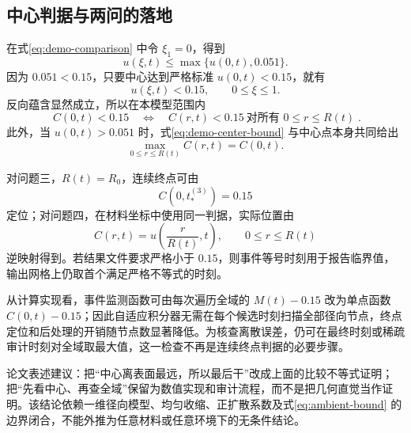 \documentclass[UTF8,a4paper,fontset=fandol]{ctexart}
\numberwithin{equation}{section}
\newcommand{\crit}{0.15}
\newcommand{\ambmax}{0.051}
\newcommand{\insertnote}[1]{\par\smallskip\noindent\colorbox{light}{\parbox{\dimexpr\linewidth-2\fboxsep\relax}{\small #1}}\par\smallskip}
\begin{document}
\subsection{中心判据与两问的落地}

在式\eqref{eq:demo-comparison} 中令 $\xi_1=0$，得到
\begin{equation}
  u(\xi,t)\le\max\{u(0,t),\ambmax\}.
  \label{eq:demo-center-bound}
\end{equation}
因为 $\ambmax<\crit$，只要中心达到严格标准 $u(0,t)<\crit$，就有
\begin{equation}
  u(\xi,t)<\crit,\qquad 0\le\xi\le1.
  \label{eq:demo-global-dry}
\end{equation}
反向蕴含显然成立，所以在本模型范围内
\begin{equation}
  \boxed{\;C(0,t)<\crit\quad\Longleftrightarrow\quad
  C(r,t)<\crit\ \text{对所有 }0\le r\le R(t)\;}.
  \label{eq:demo-equivalence}
\end{equation}
此外，当 $u(0,t)>\ambmax$ 时，式\eqref{eq:demo-center-bound} 与中心点本身共同给出
\begin{equation}
  \max_{0\le r\le R(t)}C(r,t)=C(0,t).
  \label{eq:demo-max-center}
\end{equation}

对问题三，$R(t)=R_0$，连续终点可由
\begin{equation}
  C(0,t_*^{(3)})=\crit
\end{equation}
定位；对问题四，在材料坐标中使用同一判据，实际位置由
\begin{equation}
  C(r,t)=u\!\left(\frac{r}{R(t)},t\right),\qquad 0\le r\le R(t)
\end{equation}
逆映射得到。若结果文件要求严格小于 $\crit$，则事件等号时刻用于报告临界值，输出网格上仍取首个满足严格不等式的时刻。

从计算实现看，事件监测函数可由每次遍历全域的 $M(t)-\crit$ 改为单点函数 $C(0,t)-\crit$；因此自适应积分器无需在每个候选时刻扫描全部径向节点，终点定位和后处理的开销随节点数显著降低。为核查离散误差，仍可在最终时刻或稀疏审计时刻对全域取最大值，这一检查不再是连续终点判据的必要步骤。

\insertnote{论文表述建议：把“中心离表面最远，所以最后干”改成上面的比较不等式证明；把“先看中心、再查全域”保留为数值实现和审计流程，而不是把几何直觉当作证明。该结论依赖一维径向模型、均匀收缩、正扩散系数及式\eqref{eq:ambient-bound} 的边界闭合，不能外推为任意材料或任意环境下的无条件结论。}
\end{document}
